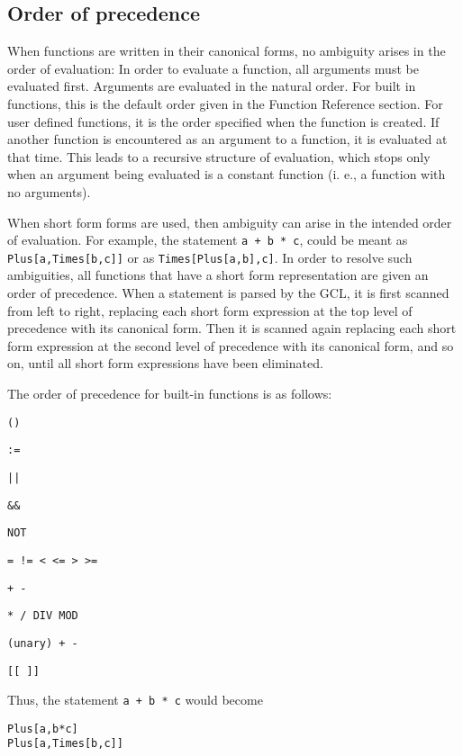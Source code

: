 \subsection{Order of precedence}

When functions are written in their canonical forms, no ambiguity
arises in the order of evaluation: In order to evaluate a function,
all arguments must be evaluated first.  Arguments are evaluated in the
natural order.  For built in functions, this is the default order
given in the Function Reference section.  For user defined functions,
it is the order specified when the function is created.  If another
function is encountered as an argument to a function, it is evaluated
at that time.  This leads to a recursive structure of evaluation,
which stops only when an argument being evaluated is a constant
function (i. e., a function with no arguments).

When short form forms are used, then ambiguity can arise in the
intended order of evaluation.  For example, the statement \verb&a + b * c&,
could be meant as \verb+Plus[a,Times[b,c]]+ or as
\verb+Times[Plus[a,b],c]+.  In order to resolve such ambiguities, all
functions that have a short form representation are given an order of
precedence.  When a statement is parsed by the GCL, it is first
scanned from left to right, replacing each short form expression at the
top level of precedence with its canonical form.  Then it is scanned
again replacing each short form expression at the second level of
precedence with its canonical form, and so on, until all short form
expressions have been eliminated.  

The order of precedence for built-in functions is as follows:
\bd
\item
\verb+()+
\item
\verb+:=+
\item
\verb+||+
\item
\verb+&&+
\item
\verb+NOT+
\item
\verb+= != < <= > >=+
\item
\verb&+ -&
\item
\verb+* / DIV MOD+
\item
\verb&(unary) + -&
\item
\verb+[[ ]]+
\ed

Thus, the statement \verb&a + b * c& would become 
\begin{verbatim}
Plus[a,b*c]
Plus[a,Times[b,c]]
\end{verbatim}

